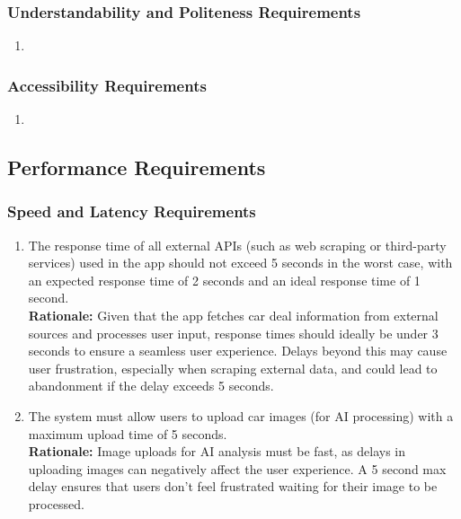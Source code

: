 \documentclass[]{article}
\begin{document}
\begin{enumerate}
\subsubsection{Understandability and Politeness Requirements}
\label{ssub:understandability_and_politeness_requirements}
\begin{enumerate}[{UH-UP}1. ]
	\item 
\end{enumerate}

\subsubsection{Accessibility Requirements}
\label{ssub:accessibility_requirements}
\begin{enumerate}[{UH-A}1. ]
	\item 
\end{enumerate}


\subsection{Performance Requirements}
\label{sub:performance_requirements}

\subsubsection{Speed and Latency Requirements}
\label{ssub:speed_and_latency_requirements}
\begin{enumerate}[{PR-SL}1.]
    \item The response time of all external APIs (such as web scraping or third-party services) used in the app should not exceed 5 seconds in the worst case, with an expected response time of 2 seconds and an ideal response time of 1 second.  \\
    \textbf{Rationale:} Given that the app fetches car deal information from external sources and processes user input, response times should ideally be under 3 seconds to ensure a seamless user experience. Delays beyond this may cause user frustration, especially when scraping external data, and could lead to abandonment if the delay exceeds 5 seconds.

    \item The system must allow users to upload car images (for AI processing) with a maximum upload time of 5 seconds.  \\
    \textbf{Rationale:} Image uploads for AI analysis must be fast, as delays in uploading images can negatively affect the user experience. A 5 second max delay ensures that users don't feel frustrated waiting for their image to be processed.


\end{enumerate}
\end{enumerate}
\end{document}
